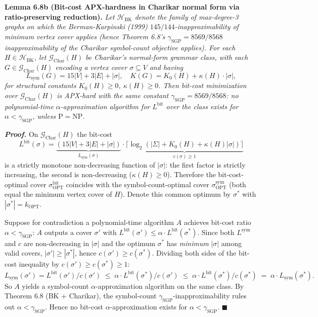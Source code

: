 \documentclass[
]{article}
\begin{document}
\textbf{Lemma 6.8b (Bit-cost APX-hardness in Charikar normal form via
ratio-preserving reduction).} \emph{Let $\mathcal{H}_{\mathrm{BK}}$
denote the family of max-degree-3 graphs on which the
Berman-Karpinski (1999) $145/144$-inapproximability of minimum
vertex cover applies (hence Theorem 6.8's $\gamma_{\mathrm{SGP}} =
8569/8568$ inapproximability of the Charikar symbol-count objective
applies). For each $H \in \mathcal{H}_{\mathrm{BK}}$, let
$\mathcal{G}_{\mathrm{Char}}(H)$ be Charikar's normal-form grammar
class, with each $G \in \mathcal{G}_{\mathrm{Char}}(H)$ encoding a
vertex cover $\sigma \subseteq V$ and having}
\[
L_{\mathrm{sym}}(G) = 15|V| + 3|E| + |\sigma|, \quad
K(G) = K_0(H) + \kappa(H) \cdot |\sigma|,
\]
\emph{for structural constants $K_0(H) \geq 0$, $\kappa(H) \geq 0$.
Then bit-cost minimization over $\mathcal{G}_{\mathrm{Char}}(H)$ is
APX-hard with the same constant $\gamma_{\mathrm{SGP}} = 8569/8568$:
no polynomial-time $\alpha$-approximation algorithm for
$L^{\mathrm{bit}}$ over the class exists for $\alpha <
\gamma_{\mathrm{SGP}}$, unless $\mathrm{P} = \mathrm{NP}$.}

\emph{\textbf{Proof.}} On $\mathcal{G}_{\mathrm{Char}}(H)$ the bit-cost
\[
L^{\mathrm{bit}}(\sigma) = \underbrace{(15|V| + 3|E| + |\sigma|)}_{L_{\mathrm{sym}}(\sigma)} \cdot
\underbrace{\lceil \log_2(|\Sigma| + K_0(H) + \kappa(H) |\sigma|) \rceil}_{c(\sigma) \geq 1}
\]
is a strictly monotone non-decreasing function of $|\sigma|$: the
first factor is strictly increasing, the second is non-decreasing
($\kappa(H) \geq 0$). Therefore the bit-cost-optimal cover
$\sigma_{\mathrm{OPT}}^{\mathrm{bit}}$ coincides with the
symbol-count-optimal cover $\sigma_{\mathrm{OPT}}^{\mathrm{sym}}$
(both equal the minimum vertex cover of $H$). Denote this common
optimum by $\sigma^*$ with $|\sigma^*| = k_{\mathrm{OPT}}$.

Suppose for contradiction a polynomial-time algorithm $A$ achieves
bit-cost ratio $\alpha < \gamma_{\mathrm{SGP}}$: $A$ outputs a cover
$\sigma'$ with $L^{\mathrm{bit}}(\sigma') \leq \alpha \cdot
L^{\mathrm{bit}}(\sigma^*)$. Since both $L^{\mathrm{sym}}$ and $c$
are non-decreasing in $|\sigma|$ and the optimum $\sigma^*$ has
\emph{minimum} $|\sigma|$ among valid covers, $|\sigma'| \geq |\sigma^*|$,
hence $c(\sigma') \geq c(\sigma^*)$. Dividing both sides of the
bit-cost inequality by $c(\sigma') \geq c(\sigma^*) \geq 1$:
\[
L_{\mathrm{sym}}(\sigma') = L^{\mathrm{bit}}(\sigma') / c(\sigma')
\;\leq\; \alpha \cdot L^{\mathrm{bit}}(\sigma^*) / c(\sigma')
\;\leq\; \alpha \cdot L^{\mathrm{bit}}(\sigma^*) / c(\sigma^*)
\;=\; \alpha \cdot L_{\mathrm{sym}}(\sigma^*).
\]
So $A$ yields a symbol-count $\alpha$-approximation algorithm on the
same class. By Theorem 6.8 (BK + Charikar), the symbol-count
$\gamma_{\mathrm{SGP}}$-inapproximability rules out $\alpha <
\gamma_{\mathrm{SGP}}$. Hence no bit-cost $\alpha$-approximation
exists for $\alpha < \gamma_{\mathrm{SGP}}$.
\hfill$\blacksquare$
\end{document}

